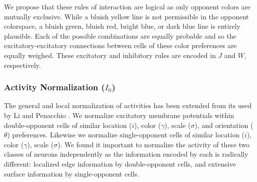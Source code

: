 \documentclass[journal,onecolumn]{IEEEtran}
\begin{document}
We propose that these rules of interaction are logical as only opponent colors are mutually exclusive. While a bluish yellow line is not permissible in the opponent colorspace, a bluish green, bluish red, bright blue, or dark blue line is entirely plausible. Each of the possible combinations are equally probable and so the excitatory-excitatory connections between cells of these color preferences are equally weighed. These excitatory and inhibitory rules are encoded in $J$ and $W$, respectively.

\subsubsection*{Activity Normalization ($I_0$)}
The general and local normalization of activities \cite{heeger:1993} has been extended from its used by Li \cite{li:1999} and Penacchio \cite{penacchio:2013}. We normalize excitatory membrane potentials within double-opponent cells of similar location ($i$), color ($\gamma$), scale ($\sigma$), and orientation ($\theta$) preferences. Likewise we normalize single-opponent cells of similar location ($i$), color ($\gamma$), scale ($\sigma$). We found it important to normalize the activity of these two classes of neurons independently as the information encoded by each is radically different: localized edge information by double-opponent cells, and extensive surface information by single-opponent cells.
\end{document}
